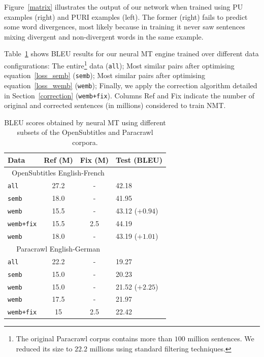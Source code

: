 \documentclass[11pt,a4paper]{article}
\begin{document}
Figure~\ref{matrix} illustrates the output of our network when trained using PU examples (right) and PURI examples (left).  
The former (right) fails to predict some word divergences, most likely because in training it never saw sentences mixing divergent and non-divergent words in the same example. 

Table~\ref{results} shows BLEU results for our neural MT engine trained over different data configurations:
The entire\footnote{The original Paracrawl corpus contains more than $100$ million sentences. We reduced its size to $22.2$ millions using standard filtering techniques.} data (\texttt{all}); 
Most similar pairs after optimising equation~\ref{loss_semb} (\texttt{semb}); 
Most similar pairs after optimising equation~\ref{loss_wemb} (\texttt{wemb}); 
Finally, we apply the correction algorithm detailed in Section~\ref{correction} (\texttt{wemb+fix}).
Columns Ref and Fix indicate the number of original and corrected sentences (in millions) considered to train NMT.

\begin{table}[h!]
\small
\center
\begin{tabular}{lccl}
\hline
\bf Data & \bf Ref (M) & \bf Fix (M) & \bf Test (BLEU) \\ %
\hline
\multicolumn{3}{c}{\scriptsize{OpenSubtitles English-French}} \\
\texttt{all}                  & 27.2 & - & 42.18 \\
\texttt{semb}            & 18.0 & - & 41.95\\
\texttt{wemb}           & 15.5 & - & 43.12  ($+0.94$)\\
\texttt{wemb+fix}   & 15.5 & 2.5 & 44.19 \\
\texttt{wemb}           & 18.0 & - & 43.19  ($+1.01$)\\
\hline
\multicolumn{3}{c}{\scriptsize{Paracrawl English-German}} \\
\texttt{all}                  & 22.2 & - & 19.27 \\ 
\texttt{semb}            & 15.0 & - & 20.23\\
\texttt{wemb}           & 15.0 & - & 21.52 ($+2.25$)\\
\texttt{wemb}           & 17.5 & - & 21.97   \\
\texttt{wemb+fix}   & 15 & 2.5 & 22.42\\
\hline
\end{tabular}
\caption{BLEU scores obtained by neural MT using different subsets of the OpenSubtitles and Paracrawl corpora.}
\label{results}
\end{table}
\end{document}
